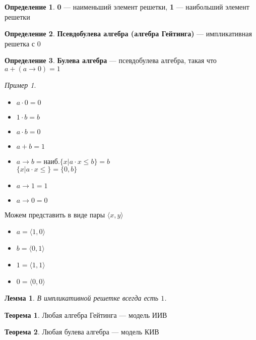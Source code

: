 \documentclass[english]{article}
\theoremstyle{plain}
\newtheorem{lemma}{Лемма}
\theoremstyle{remark}
\newtheorem*{examp}{Пример}
\theoremstyle{definition}
\newtheorem{theorem}{Теорема}[section]
\newtheorem*{definition}{Определение}
\begin{document}
\begin{definition}
\textbf{0} --- наименьший элемент решетки, \textbf{1} --- наибольший элемент решетки
\end{definition}
\begin{definition}
\textbf{Псевдобулева алгебра (алгебра Гейтинга)} --- импликативная решетка с \(0\)
\end{definition}
\begin{definition}
\textbf{Булева алгебра} --- псевдобулева алгебра, такая что \(a + (a \to 0) = 1\)
\end{definition}
\begin{examp}
\-
\begin{center}
\end{center}
\begin{itemize}
\item \(a \cdot 0 = 0\)
\item \(1\cdot b = b\)
\item \(a \cdot b = 0\)
\item \(a + b = 1\)
\item \(a \to b = \text{наиб.}\{x \big| a\cdot x \le b\} = b\) \\
\(\{x \big| a \cdot x \le \} = \{0, b\}\)
\item \(a \to 1 = 1\)
\item \(a \to 0 = 0\)
\end{itemize}
Можем представить в виде пары \(\langle x, y \rangle\)
\begin{itemize}
\item \(a = \langle 1, 0 \rangle\)
\item \(b = \langle 0 , 1\rangle\)
\item \(1 = \langle 1, 1 \rangle\)
\item \(0 = \langle 0, 0 \rangle\)
\end{itemize}
\end{examp}
\begin{lemma}
В импликативной решетке всегда есть \(1\).
\end{lemma}
\begin{theorem}
Любая алгебра Гейтинга --- модель ИИВ
\end{theorem}
\begin{theorem}
Любая булева алгебра --- модель КИВ
\end{theorem}
\end{document}
